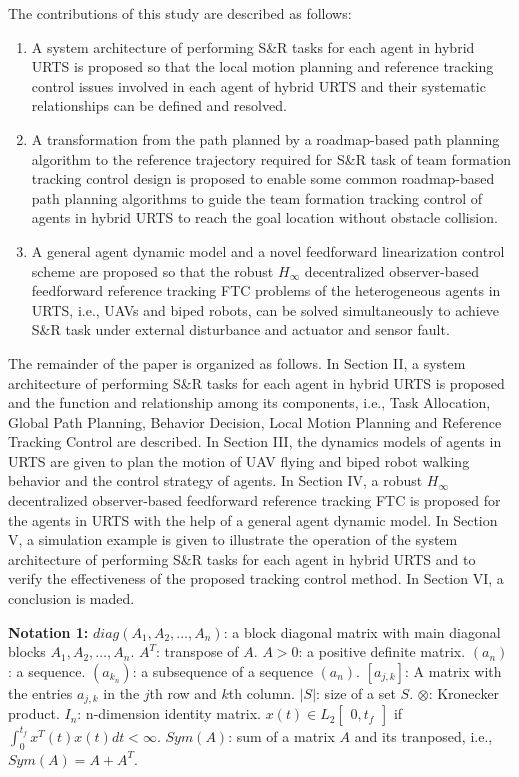 \documentclass[journal,12pt,onecolumn,draftclsnofoot,]{IEEEtran}
\begin{document}
The contributions of this study are described as follows:
\begin{enumerate}
    \item A system architecture of performing S\&R tasks for each agent in hybrid URTS is proposed so that the local motion planning and reference tracking control issues involved in each agent of hybrid URTS and their systematic relationships can be defined and resolved.
    \item A transformation from the path planned by a roadmap-based path planning algorithm to the reference trajectory required for S\&R task of team formation tracking control design is proposed to enable some common roadmap-based path planning algorithms to guide the team formation tracking control of agents in hybrid URTS to reach the goal location without obstacle collision.
    \item A general agent dynamic model and a novel feedforward linearization control scheme are proposed so that the robust $H_\infty$ decentralized observer-based feedforward reference tracking FTC problems of the heterogeneous agents in URTS, i.e., UAVs and biped robots, can be solved simultaneously to achieve S\&R task under external disturbance and actuator and sensor fault.
\end{enumerate}

The remainder of the paper is organized as follows. In Section II, a system architecture of performing S\&R tasks for each agent in hybrid URTS is proposed and the function and relationship among its components, i.e., Task Allocation, Global Path Planning, Behavior Decision, Local Motion Planning and Reference Tracking Control are described. In Section III, the dynamics models of agents in URTS are given to plan the motion of UAV flying and biped robot walking behavior and the control strategy of agents. In Section IV, a robust $H_\infty$ decentralized observer-based feedforward reference tracking FTC is proposed for the agents in URTS with the help of a general agent dynamic model. In Section V, a simulation example is given to illustrate the operation of the system architecture of performing S\&R tasks for each agent in hybrid URTS and to verify the effectiveness of the proposed tracking control method. In Section VI, a conclusion is maded.

\textbf{Notation 1:} 
$diag(A_1, A_2, \dots, A_n)$: a block diagonal matrix with main diagonal blocks $A_1\mathbin{,} A_2\mathbin{,} \dots\mathbin{,} A_n$. $A^T$: transpose of $A$. $A > 0$: a positive definite matrix. $(a_n)$: a sequence. $(a_{k_n})$: a subsequence of a sequence $(a_n)$. $[a_{j,k}]$: A matrix with the entries $a_{j,k}$ in the $j$th row and $k$th column. $\vert{S}\vert$: size of a set $S$. $\otimes$: Kronecker product. $I_n$: n-dimension identity matrix. $x(t)\in L_2\begin{bmatrix}
    0,t_f 
\end{bmatrix}$ if $\int^{t_f}_{0}x^T(t)x(t)dt<\infty$. $Sym(A)$: sum of a matrix $A$ and its tranposed, i.e., $Sym(A) = A+A^T$.
\end{document}
